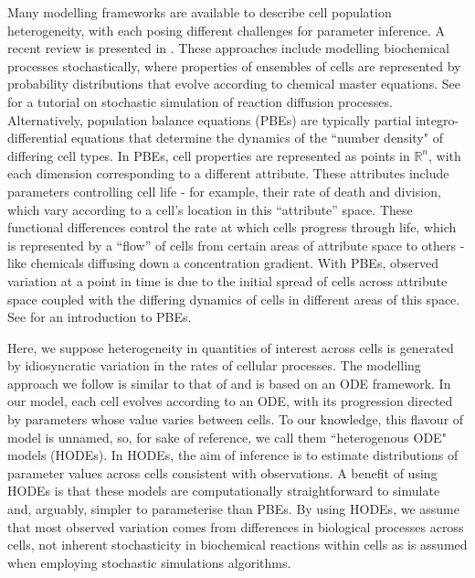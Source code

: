 Many modelling frameworks are available to describe cell population heterogeneity, with each posing different challenges for parameter inference. A recent review is presented in \cite{waldherr2018estimation}. These approaches include modelling biochemical processes stochastically, where properties of ensembles of cells are represented by probability distributions that evolve according to chemical master equations. See \cite{erban2007practical} for a tutorial on stochastic simulation of reaction diffusion processes. Alternatively, population balance equations (PBEs) are typically partial integro-differential equations that determine the dynamics of the ``number density" of differing cell types. In PBEs, cell properties are represented as points in $\mathbb{R}^n$, with each dimension corresponding to a different attribute. These attributes include parameters controlling cell life - for example, their rate of death and division, which vary according to a cell's location in this ``attribute'' space. These functional differences control the rate at which cells progress through life, which is represented by a ``flow'' of cells from certain areas of attribute space to others - like chemicals diffusing down a concentration gradient. With PBEs, observed variation at a point in time is due to the initial spread of cells across attribute space coupled with the differing dynamics of cells in different areas of this space. See \cite{ramkrishna2014population} for an introduction to PBEs.

Here, we suppose heterogeneity in quantities of interest across cells is generated by idiosyncratic variation in the rates of cellular processes. The modelling approach we follow is similar to that of \cite{dixit2018maximum} and is based on an ODE framework. In our model, each cell evolves according to an ODE, with its progression directed by parameters whose value varies between cells. To our knowledge, this flavour of model is unnamed, so, for sake of reference, we call them ``heterogenous ODE" models (HODEs). In HODEs, the aim of inference is to estimate distributions of parameter values across cells consistent with observations. A benefit of using HODEs is that these models are computationally straightforward to simulate and, arguably, simpler to parameterise than PBEs. By using HODEs, we assume that most observed variation comes from differences in biological processes across cells, not inherent stochasticity in biochemical reactions within cells as is assumed when employing stochastic simulations algorithms.

